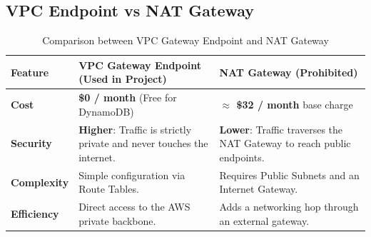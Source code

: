 \subsection{VPC Endpoint vs NAT Gateway}
\begin{table}[h]
\centering
\renewcommand{\arraystretch}{1.5}
\begin{tabular}{|l|p{7cm}|p{6cm}|}
\hline
\textbf{Feature} & \textbf{VPC Gateway Endpoint (Used in Project)} & \textbf{NAT Gateway (Prohibited)} \\ \hline
\textbf{Cost} & \textbf{\$0 / month} (Free for DynamoDB) & \textbf{$\approx$ \$32 / month} base charge \\ \hline
\textbf{Security} & \textbf{Higher}: Traffic is strictly private and never touches the internet. & \textbf{Lower}: Traffic traverses the NAT Gateway to reach public endpoints. \\ \hline
\textbf{Complexity} & Simple configuration via Route Tables. & Requires Public Subnets and an Internet Gateway. \\ \hline
\textbf{Efficiency} & Direct access to the AWS private backbone. & Adds a networking hop through an external gateway. \\ \hline
\end{tabular}
\caption{Comparison between VPC Gateway Endpoint and NAT Gateway}
\end{table}